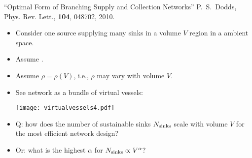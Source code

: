 \begin{frame}

  \begin{block}{
      ``Optimal Form of Branching Supply and Collection Networks''\cite{dodds2010a}
    }
    P.\ S.\ Dodds, Phys. Rev. Lett., \textbf{104}, 048702, 2010.
    \begin{itemize}
    \item<1-> 
      Consider \alert{one source} supplying \alert{many sinks} in a 
      volume $V$  region
      in a  ambient space.
    \item<1->
      Assume .
    \item<1->
      Assume \alert{$\rho = \rho(V)$}, i.e., $\rho$ may vary with volume $V$.
    \item<2-> 
      See network as a bundle of virtual vessels:
      \begin{center}
        \begin{overprint}
          \texttt{[image: virtualvessels4.pdf]}
        \end{overprint}
      \end{center}
    \item<3-> 
      \alert{Q:} how does the number of sustainable
      sinks $N_{\textnormal{sinks}}$
      scale with volume $V$ for the most efficient network design?
    \item<4-> 
      \alert{Or:} what is the highest $\alpha$ for $N_{\textnormal{sinks}} \propto V^{\alpha}$?
    \end{itemize}
  \end{block}

\end{frame}


